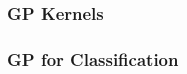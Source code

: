\begin{frame} \frametitle{GP Kernels}
\end{frame}

\begin{frame} \frametitle{GP for Classification}
\end{frame}

\begin{frame} \frametitle{}
\end{frame}

\begin{frame} \frametitle{}
\end{frame}

\begin{frame} \frametitle{}
\end{frame}

